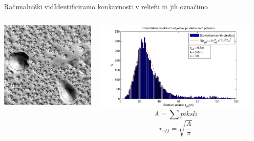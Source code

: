 \documentclass{beamer}
\begin{document}
\begin{frame}{Računalniški vid}{Identificiramo konkavnosti v reliefu in jih označimo}
\begin{columns}
  \begin{column}{0.55\textwidth}
    \hspace*{0.02\textwidth}\includegraphics[width=\textwidth]{slike/menisija-vrtace}
  \end{column}

  \begin{column}{0.7\textwidth}
    \hspace*{-0.025\textwidth}\includegraphics[width=\textwidth]{slike/menisija-polmeri-hist-maxwell}
    \footnotesize
    \begin{equation} A = \sum piksli \end{equation}
    \begin{equation}r_{eff} = \sqrt{\frac{A}{\pi}} \end{equation}
  \end{column}
\end{columns}
\end{frame}
\end{document}
